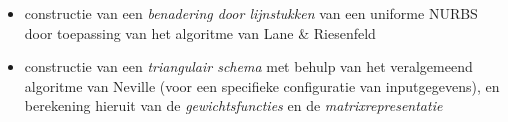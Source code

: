 \documentclass{report}
\begin{document}
\begin{itemize}
		\item {} constructie van een  \textit{benadering door lijnstukken} van een uniforme NURBS door toepassing van het algoritme van Lane \& Riesenfeld
		\item {} constructie van een \textit{triangulair schema} met behulp van het veralgemeend algoritme van Neville (voor een specifieke configuratie van inputgegevens), en berekening hieruit van de \textit{gewichtsfuncties} en de \textit{matrixrepresentatie}
		
	\end{itemize}
	
\end{document}
